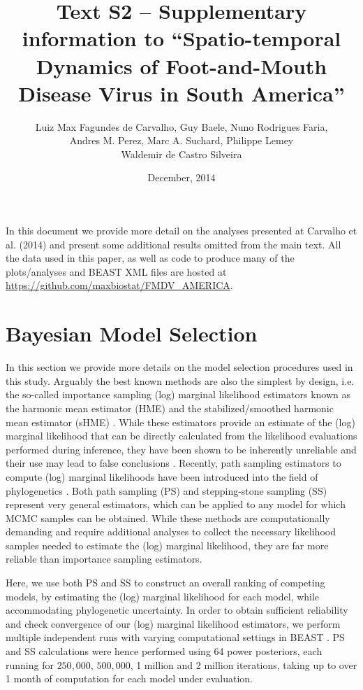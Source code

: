 \documentclass[a4paper,10pt]{article}
\title{Text S2 -- Supplementary information to ``Spatio-temporal Dynamics of Foot-and-Mouth Disease Virus in South America''}
\author{
Luiz Max Fagundes de Carvalho, Guy Baele, Nuno Rodrigues Faria,\\
Andres M. Perez, Marc A. Suchard,  Philippe Lemey\\
Waldemir de Castro Silveira
}
\date{December, 2014}
\begin{document}
\maketitle

In this document we provide more detail on the analyses presented at Carvalho et al. (2014) and present some additional results omitted from the main text.
All the data used in this paper, as well as code to produce many of the plots/analyses and BEAST XML files are hosted at \url{https://github.com/maxbiostat/FMDV_AMERICA}.
\section{Bayesian Model Selection}

In this section we provide more details on the model selection procedures used in this study.
Arguably the best known methods are also the simplest by design, i.e. the so-called importance sampling (log) marginal likelihood estimators known as the harmonic mean estimator (HME) \cite{Newton} and the stabilized/smoothed harmonic mean estimator (sHME) \cite{M-suchard2005models}.
While these estimators provide an estimate of the (log) marginal likelihood that can be directly calculated from the likelihood evaluations performed during inference, they have been shown to be inherently unreliable and their use may lead to false conclusions \cite{M-LartillotPhilippe, M-Xie, M-Baele2012, M-Baele2013a,M-Baele2013b}.
Recently, path sampling estimators to compute (log) marginal likelihoods have been introduced into the field of phylogenetics \cite{M-LartillotPhilippe, M-Xie}.
Both path sampling (PS) and stepping-stone sampling (SS) represent very general estimators, which can be applied to any model for which MCMC samples can be obtained.
While these methods are computationally demanding and require additional analyses to collect the necessary likelihood samples needed to estimate the (log) marginal likelihood, they are far more reliable than importance sampling estimators.

Here, we use both PS and SS to construct an overall ranking of competing models, by estimating the (log) marginal likelihood for each model, while accommodating phylogenetic uncertainty.
In order to obtain sufficient reliability and check convergence of our (log) marginal likelihood estimators, we perform multiple independent runs with varying computational settings in BEAST \cite{M-beast2012}.
PS and SS calculations were hence performed using 64 power posteriors, each running for $250,000$, $500,000$, 1 million and 2 million iterations, taking up to over 1 month of computation for each model under evaluation.
\end{document}
